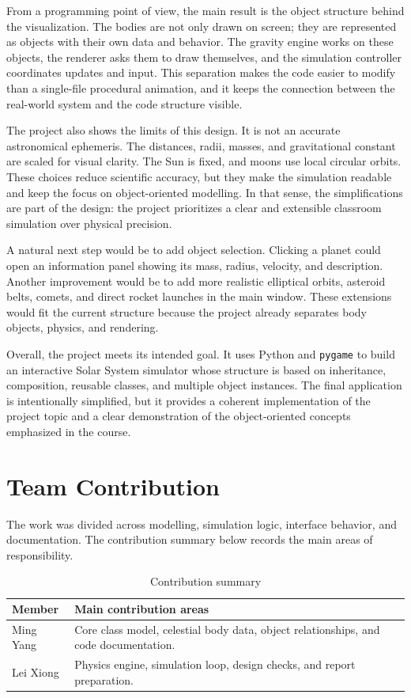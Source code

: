 \documentclass[a4paper,12pt]{article}
\begin{document}
From a programming point of view, the main result is the object structure behind
the visualization. The bodies are not only drawn on screen; they are represented
as objects with their own data and behavior. The gravity engine works on these
objects, the renderer asks them to draw themselves, and the simulation
controller coordinates updates and input. This separation makes the code easier
to modify than a single-file procedural animation, and it keeps the connection
between the real-world system and the code structure visible.

The project also shows the limits of this design. It is not an accurate
astronomical ephemeris. The distances, radii, masses, and gravitational
constant are scaled for visual clarity. The Sun is fixed, and moons use local
circular orbits. These choices reduce scientific accuracy, but they make the
simulation readable and keep the focus on object-oriented modelling. In that
sense, the simplifications are part of the design: the project prioritizes a
clear and extensible classroom simulation over physical precision.

A natural next step would be to add object selection. Clicking a planet could
open an information panel showing its mass, radius, velocity, and description.
Another improvement would be to add more realistic elliptical orbits, asteroid
belts, comets, and direct rocket launches in the main window. These extensions
would fit the current structure because the project already separates body
objects, physics, and rendering.

Overall, the project meets its intended goal. It uses Python and
\texttt{pygame} to build an interactive Solar System simulator whose structure
is based on inheritance, composition, reusable classes, and multiple object
instances. The final application is intentionally simplified, but it provides a
coherent implementation of the project topic and a clear demonstration of the
object-oriented concepts emphasized in the course.

\section{Team Contribution}

The work was divided across modelling, simulation logic, interface behavior,
and documentation. The contribution summary below records the main areas of
responsibility.

\begin{table}[H]
    \centering
    \caption{Contribution summary}
    \label{tab:contributions}
    \begin{tabular}{p{}p{}}
        \toprule
        Member & Main contribution areas \\
        \midrule
        Ming Yang & Core class model, celestial body data, object relationships, and code documentation. \\
        Lei Xiong & Physics engine, simulation loop, design checks, and report preparation. \\
        \bottomrule
    \end{tabular}
\end{table}
\end{document}
